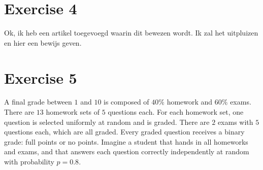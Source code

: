 \documentclass[10pt, a4paper, twoside]{amsart}
\begin{document}
\section*{Exercise 4}
Ok, ik heb een artikel \citep{frigyik2008functional} toegevoegd waarin dit bewezen wordt. Ik zal het uitpluizen en hier een bewijs geven.



\section*{Exercise 5}
A final grade between $1$ and $10$ is composed of $40\%$ homework
and $60\%$ exams. There are $13$ homework sets of $5$ questions each. For
each homework set, one question is selected uniformly at random and is
graded. There are $2$ exams with $5$ questions each, which are all graded.
Every graded question receives a binary grade: full points or no points.
Imagine a student that hands in all homeworks and exams, and that answers 
each question correctly independently at random with probability $p = 0.8$.
\end{document}
